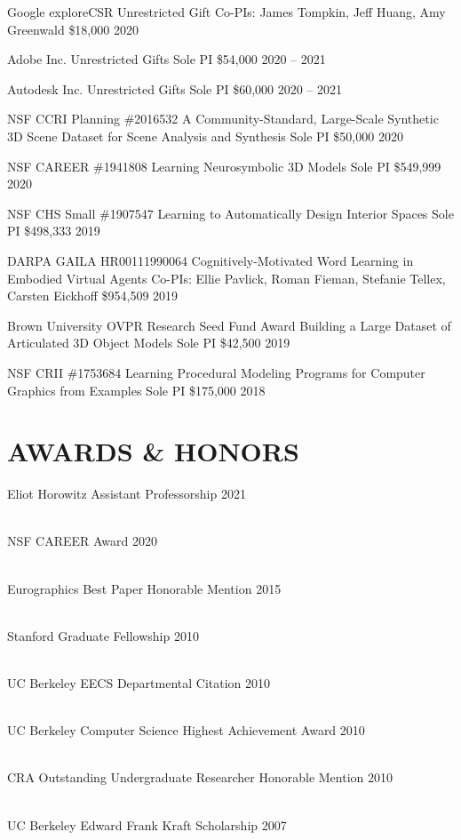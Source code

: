 \documentclass[line,margin]{res}
\begin{document}
\begin{resume}
\funding
{Google exploreCSR}
{Unrestricted Gift}
{Co-PIs: James Tompkin, Jeff Huang, Amy Greenwald}
{\$18,000}
{2020}

\funding
{Adobe Inc.}
{Unrestricted Gifts}
{Sole PI}
{\$54,000}
{2020 -- 2021}

\funding
{Autodesk Inc.}
{Unrestricted Gifts}
{Sole PI}
{\$60,000}
{2020 -- 2021}

\funding
{NSF CCRI Planning \#2016532}
{A Community-Standard, Large-Scale Synthetic 3D Scene Dataset for Scene Analysis and Synthesis}
{Sole PI}
{\$50,000}
{2020}

\funding
{NSF CAREER \#1941808}
{Learning Neurosymbolic 3D Models}
{Sole PI}
{\$549,999}
{2020}

\funding
{NSF CHS Small \#1907547}
{Learning to Automatically Design Interior Spaces}
{Sole PI}
{\$498,333}
{2019}

\funding
{DARPA GAILA HR00111990064}
{Cognitively-Motivated Word Learning in Embodied Virtual Agents}
{Co-PIs: Ellie Pavlick, Roman Fieman, Stefanie Tellex, Carsten Eickhoff}
{\$954,509}
{2019}

\funding
{Brown University OVPR Research Seed Fund Award}
{Building a Large Dataset of Articulated 3D Object Models}
{Sole PI}
{\$42,500}
{2019}

\funding
{NSF CRII \#1753684}
{Learning Procedural Modeling Programs for Computer Graphics from Examples}
{Sole PI}
{\$175,000}
{2018}


\section{AWARDS \& HONORS}

\newcommand{\award}[2] {
	#1 \hfill #2
}

\award
{Eliot Horowitz Assistant Professorship}
{2021}
\\
\award
{NSF CAREER Award}
{2020}
\\
\award
{Eurographics Best Paper Honorable Mention}
{2015}
\\
\award
{Stanford Graduate Fellowship}
{2010}
\\
\award
{UC Berkeley EECS Departmental Citation}
{2010}
\\
\award
{UC Berkeley Computer Science Highest Achievement Award}
{2010}
\\
\award
{CRA Outstanding Undergraduate Researcher Honorable Mention}
{2010}
\\
\award
{UC Berkeley Edward Frank Kraft Scholarship}
{2007}


\end{resume}
\end{document}
